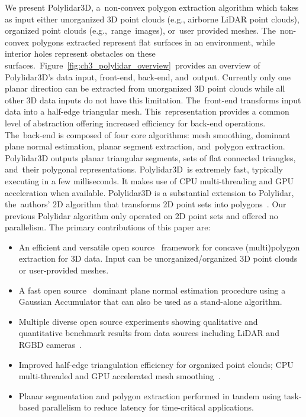 We present Polylidar3D, a~non-convex polygon extraction algorithm which takes as input either unorganized 3D point clouds (e.g., airborne LiDAR point clouds), organized point clouds (e.g.,~range~images), or~user provided meshes. The~non-convex polygons extracted represent flat surfaces in an environment, while interior holes represent obstacles on these surfaces.~Figure~\ref{fig:ch3_polylidar_overview}~provides an overview of Polylidar3D's data input, front-end, back-end, and~output.  Currently only one planar direction can be extracted from unorganized 3D point clouds while all other 3D data inputs do not have this limitation. The~front-end transforms input data into a half-edge triangular mesh.  This~representation provides a common level of abstraction offering increased efficiency for back-end operations. The~back-end is composed of four core algorithms: mesh smoothing, dominant plane normal estimation, planar segment extraction, and~polygon extraction.  Polylidar3D outputs planar triangular segments, sets of flat connected triangles, and~their polygonal representations. Polylidar3D~is extremely fast, typically executing in a few milliseconds. It makes use of CPU multi-threading and GPU acceleration when available. Polylidar3D is a substantial extension to Polylidar, the~authors' 2D algorithm that transforms 2D point sets into polygons~\cite{castagno_polylidar_2020}. Our previous Polylidar algorithm only operated on 2D point sets and offered no parallelism. 
The primary contributions of this paper are:

\begin{itemize}
  \item An efficient and versatile open source~\cite{Castagno_Github_Polylidar} framework for concave (multi)polygon extraction for 3D data. Input can be unorganized/organized 3D point clouds or user-provided meshes.
  \item A fast open source~\cite{Castagno_Github_fastga} dominant plane normal estimation procedure using a Gaussian Accumulator that can also be used as a stand-alone algorithm.
  \item Multiple diverse open source experiments showing qualitative and quantitative benchmark results from data sources including LiDAR and RGBD cameras~\cite{Castagno_Github_Polylidar3D_Kitti, Castagno_Github_Polylidar3D_RealSense, Castagno_Github_Polylidar_Synpeb}.
  \item Improved half-edge triangulation efficiency for organized point clouds; CPU multi-threaded and GPU accelerated mesh smoothing~\cite{Castagno_Github_opf}. 
  \item Planar segmentation and polygon extraction performed in tandem using task-based parallelism to reduce latency for time-critical applications. 
\end{itemize}

